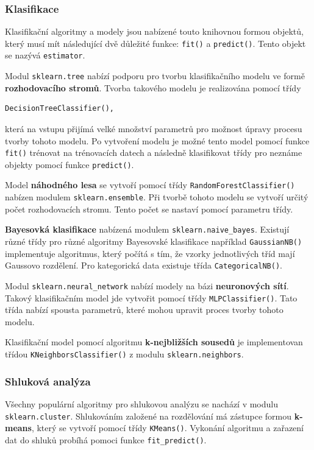 \subsubsection*{Klasifikace}
Klasifikační algoritmy a modely jsou nabízené touto knihovnou formou objektů, který musí mít následující dvě důležité funkce: \verb|fit()| a \verb|predict()|. Tento objekt se nazývá \verb|estimator|.

Modul \verb|sklearn.tree| nabízí podporu pro tvorbu klasifikačního modelu ve formě \textbf{rozhodovacího stromů}. Tvorba takového modelu je realizována pomocí třídy \begin{verbatim}DecisionTreeClassifier(),\end{verbatim} která na vstupu přijímá velké množství parametrů pro možnost úpravy procesu tvorby tohoto modelu. Po vytvoření modelu je možné tento model pomocí funkce \verb|fit()| trénovat na trénovacích datech a následně klasifikovat třídy pro neznáme objekty pomocí funkce \verb|predict()|. 

Model \textbf{náhodného lesa} se vytvoří pomocí třídy \verb|RandomForestClassifier()| nabízen modulem \verb|sklearn.ensemble|. Při tvorbě tohoto modelu se vytvoří určitý počet rozhodovacích stromu. Tento počet se nastaví pomocí parametru třídy.

\textbf{Bayesovká klasifikace} nabízená modulem \verb|sklearn.naive_bayes|. Existují různé třídy pro různé algoritmy Bayesovské klasifikace například \verb|GaussianNB()| implementuje algoritmus, který počítá s tím, že vzorky jednotlivých tříd mají Gaussovo rozdělení. Pro kategorická data existuje třída \verb|CategoricalNB()|.

Modul \verb|sklearn.neural_network| nabízí modely na bázi \textbf{neuronových sítí}. Takový klasifikačním model jde vytvořit pomocí třídy \verb|MLPClassifier()|. Tato třída nabízí spousta parametrů, které mohou upravit proces tvorby tohoto modelu.

Klasifikační model pomocí algoritmu \textbf{k-nejbližších sousedů} je implementovan třídou \verb|KNeighborsClassifier()| z modulu \verb|sklearn.neighbors|.

\subsubsection*{Shluková analýza}
Všechny populární algoritmy pro shlukovou analýzu se nachází v modulu \verb|sklearn.cluster|.
Shlukováním založené na rozdělování má zástupce formou \textbf{k-means}, který se vytvoří pomocí třídy \verb|KMeans()|. Vykonání algoritmu a zařazení dat do shluků probíhá pomoci funkce \verb|fit_predict()|.

